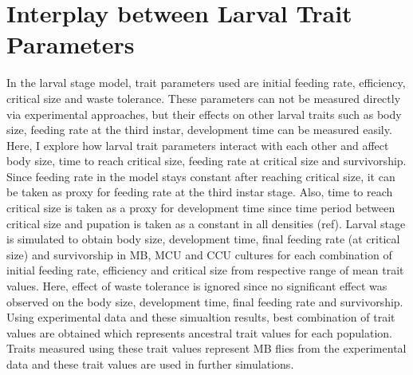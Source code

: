 \chapter{Interplay between Larval Trait Parameters}
In the larval stage model, trait parameters used are initial feeding rate, efficiency, critical size and waste tolerance. These parameters can not be measured directly via experimental approaches, but their effects on other larval traits such as body size, feeding rate at the third instar, development time can be measured easily. Here, I explore how larval trait parameters interact with each other and affect body size, time to reach critical size, feeding rate at critical size and survivorship. Since feeding rate in the model stays constant after reaching critical size, it can be taken as proxy for feeding rate at the third instar stage. Also, time to reach critical size is taken as a proxy for development time since time period between critical size and pupation is taken as a constant in all densities (ref). Larval stage is simulated to obtain body size, development time, final feeding rate (at critical size) and survivorship in MB, MCU and CCU cultures for each combination of initial feeding rate, efficiency and critical size from respective range of mean trait values. Here, effect of waste tolerance is ignored since no significant effect was observed on the body size, development time, final feeding rate and survivorship. Using experimental data and these simualtion results, best combination of trait values are obtained which represents ancestral trait values for each population. Traits measured using these trait values represent MB flies from the experimental data and these trait values are used in further simulations.


